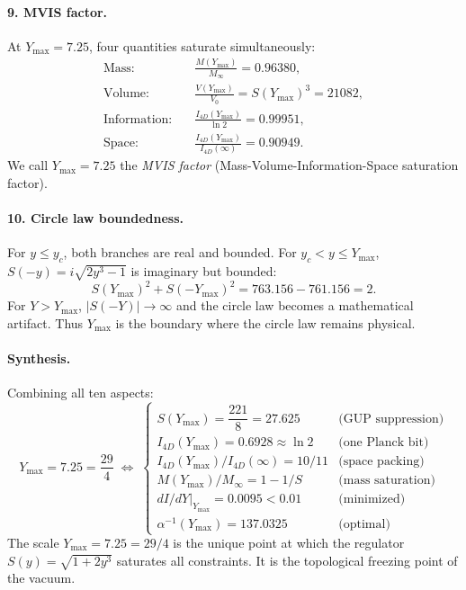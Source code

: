 \documentclass[12pt,oneside,openany]{book}
\begin{document}
\paragraph{9. MVIS factor.} At \(Y_{\max} = 7.25\), four quantities saturate simultaneously:
\begin{align}
\text{Mass:} \quad & \frac{M(Y_{\max})}{M_\infty} = 0.96380, \\
\text{Volume:} \quad & \frac{V(Y_{\max})}{V_0} = S(Y_{\max})^3 = 21082, \\
\text{Information:} \quad & \frac{I_{4D}(Y_{\max})}{\ln 2} = 0.99951, \\
\text{Space:} \quad & \frac{I_{4D}(Y_{\max})}{I_{4D}(\infty)} = 0.90949.
\end{align}
We call \(Y_{\max} = 7.25\) the \emph{MVIS factor} (Mass-Volume-Information-Space saturation factor).

\paragraph{10. Circle law boundedness.} For \(y \leq y_c\), both branches are real and bounded. For \(y_c < y \leq Y_{\max}\), \(S(-y) = i\sqrt{2y^3-1}\) is imaginary but bounded:
\begin{equation}
S(Y_{\max})^2 + S(-Y_{\max})^2 = 763.156 - 761.156 = 2.
\end{equation}
For \(Y > Y_{\max}\), \(|S(-Y)| \to \infty\) and the circle law becomes a mathematical artifact. Thus \(Y_{\max}\) is the boundary where the circle law remains physical.

\paragraph{Synthesis.} Combining all ten aspects:
\begin{equation}
\boxed{
Y_{\max} = 7.25 = \frac{29}{4} \; \Longleftrightarrow \;
\begin{cases}
S(Y_{\max}) = \dfrac{221}{8} = 27.625 & \text{(GUP suppression)} \\
I_{4D}(Y_{\max}) = 0.6928 \approx \ln 2 & \text{(one Planck bit)} \\
I_{4D}(Y_{\max})/I_{4D}(\infty) = 10/11 & \text{(space packing)} \\
M(Y_{\max})/M_\infty = 1 - 1/S & \text{(mass saturation)} \\
dI/dY|_{Y_{\max}} = 0.0095 < 0.01 & \text{(minimized)} \\
\alpha^{-1}(Y_{\max}) = 137.0325 & \text{(optimal)}
\end{cases}
}
\label{eq:mviseqn}
\end{equation}
The scale \(Y_{\max} = 7.25 = 29/4\) is the unique point at which the regulator \(S(y) = \sqrt{1+2y^3}\) saturates all constraints. It is the topological freezing point of the vacuum.
\end{document}
